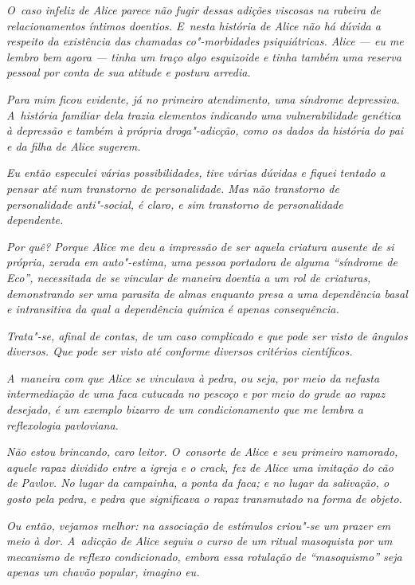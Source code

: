 \emph{O~caso infeliz de Alice parece não fugir dessas adições viscosas
na rabeira de relacionamentos íntimos doentios. E~nesta história de
Alice não há dúvida a respeito da existência das chamadas co"-morbidades
psiquiátricas. Alice --- eu me lembro bem agora --- tinha um traço algo
esquizoide e tinha também uma reserva pessoal por conta de sua atitude e
postura arredia.}~

\emph{Para mim ficou evidente, já no primeiro atendimento, uma síndrome
depressiva. A~história familiar dela trazia elementos indicando uma
vulnerabilidade genética à depressão e também à própria droga"-adicção,
como os dados da história do pai e da filha de Alice sugerem.}~

\emph{Eu então especulei várias possibilidades, tive várias dúvidas e
fiquei tentado a pensar até num transtorno de personalidade. Mas não
transtorno de personalidade anti"-social, é claro, e sim transtorno de
personalidade dependente.}~

\emph{Por quê? Porque Alice me deu a impressão de ser aquela criatura
ausente de si própria, zerada em auto"-estima, uma pessoa portadora de
alguma ``síndrome de Eco'', necessitada de se vincular de maneira
doentia a um rol de criaturas, demonstrando ser uma parasita de almas
enquanto presa a uma dependência basal e intransitiva da qual a
dependência química é apenas consequência.}~

\emph{Trata"-se, afinal de contas, de um caso complicado e que pode ser
visto de ângulos diversos. Que pode ser visto até conforme diversos
critérios científicos.}~

\emph{A~maneira com que Alice se vinculava à pedra, ou seja, por meio da
nefasta intermediação de uma faca cutucada no pescoço e por meio do
grude ao rapaz desejado, é um exemplo bizarro de um condicionamento que
me lembra a reflexologia pavloviana.}~

\emph{Não estou brincando, caro leitor. O~consorte de Alice e seu
primeiro namorado, aquele rapaz dividido entre a igreja e o crack, fez
de Alice uma imitação do cão de Pavlov. No lugar da campainha, a ponta
da faca; e no lugar da salivação, o gosto pela pedra, e pedra que
significava o rapaz transmutado na forma de objeto.}~

\emph{Ou então, vejamos melhor: na associação de estímulos criou"-se um
prazer em meio à dor. A~adicção de Alice seguiu o curso de um ritual
masoquista por um mecanismo de reflexo condicionado, embora essa
rotulação de ``masoquismo'' seja apenas um chavão popular, imagino eu.}~

